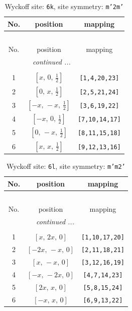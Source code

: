 \documentclass[fleqn,8pt]{jsarticle}
\begin{document}
\renewcommand{\arraystretch}{1.2}
\begin{longtable}{ccc}
\caption{Wyckoff site: {\tt 6k}, site symmetry: {\tt m'2m'}}
 \\
 \hline \hline
No. & position & mapping \\ \hline \endfirsthead

\multicolumn{2}{l}{\tablename\ \thetable{}} \\
 \hline \hline
No. & position & mapping \\ \hline \endhead

 \hline \hline
\multicolumn{2}{r}{\footnotesize\it continued ...} \\ \endfoot

 \hline \hline
\multicolumn{2}{r}{} \\ \endlastfoot

1 & $\left[ x,\, 0,\, \frac{1}{2} \right]$ & {\tt [1,4,20,23]} \\ \hline
2 & $\left[ 0,\, x,\, \frac{1}{2} \right]$ & {\tt [2,5,21,24]} \\ \hline
3 & $\left[ - x,\, - x,\, \frac{1}{2} \right]$ & {\tt [3,6,19,22]} \\ \hline
4 & $\left[ - x,\, 0,\, \frac{1}{2} \right]$ & {\tt [7,10,14,17]} \\ \hline
5 & $\left[ 0,\, - x,\, \frac{1}{2} \right]$ & {\tt [8,11,15,18]} \\ \hline
6 & $\left[ x,\, x,\, \frac{1}{2} \right]$ & {\tt [9,12,13,16]} \\
\end{longtable}
\renewcommand{\arraystretch}{1.2}
\begin{longtable}{ccc}
\caption{Wyckoff site: {\tt 6l}, site symmetry: {\tt m'm2'}}
 \\
 \hline \hline
No. & position & mapping \\ \hline \endfirsthead

\multicolumn{2}{l}{\tablename\ \thetable{}} \\
 \hline \hline
No. & position & mapping \\ \hline \endhead

 \hline \hline
\multicolumn{2}{r}{\footnotesize\it continued ...} \\ \endfoot

 \hline \hline
\multicolumn{2}{r}{} \\ \endlastfoot

1 & $\left[ x,\, 2 x,\, 0 \right]$ & {\tt [1,10,17,20]} \\ \hline
2 & $\left[ - 2 x,\, - x,\, 0 \right]$ & {\tt [2,11,18,21]} \\ \hline
3 & $\left[ x,\, - x,\, 0 \right]$ & {\tt [3,12,16,19]} \\ \hline
4 & $\left[ - x,\, - 2 x,\, 0 \right]$ & {\tt [4,7,14,23]} \\ \hline
5 & $\left[ 2 x,\, x,\, 0 \right]$ & {\tt [5,8,15,24]} \\ \hline
6 & $\left[ - x,\, x,\, 0 \right]$ & {\tt [6,9,13,22]} \\
\end{longtable}
\end{document}
